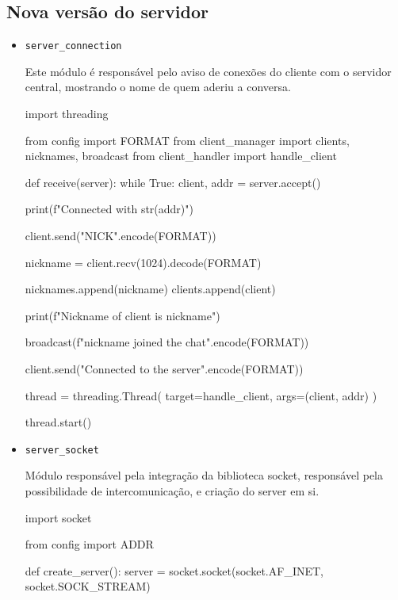 	
	\subsection*{Nova versão do servidor}
	
	\begin{itemize}
		
		\item \texttt{server\_connection}
		
		Este módulo é responsável pelo aviso de conexões do cliente com o servidor central, mostrando o nome de quem aderiu a conversa.
		
		\begin{pycode}
			import threading
			
			from config import FORMAT
			from client_manager import clients, nicknames, broadcast
			from client_handler import handle_client
			
			
			def receive(server):
			while True:
			client, addr = server.accept()
			
			print(f"Connected with {str(addr)}")
			
			client.send("NICK".encode(FORMAT))
			
			nickname = client.recv(1024).decode(FORMAT)
			
			nicknames.append(nickname)
			clients.append(client)
			
			print(f"Nickname of client is {nickname}")
			
			broadcast(f"{nickname} joined the chat".encode(FORMAT))
			
			client.send("Connected to the server".encode(FORMAT))
			
			thread = threading.Thread(
			target=handle_client,
			args=(client, addr)
			)
			
			thread.start()
			
		\end{pycode}
		
		\item \texttt{server\_socket}
		
		Módulo responsável pela integração da biblioteca socket, responsável pela possibilidade de intercomunicação, e criação do server em si.
		
		\begin{pycode}
			import socket
			
			from config import ADDR
			
			
			def create_server():
			server = socket.socket(socket.AF_INET, socket.SOCK_STREAM)
			

\end{pycode}
\end{itemize}
